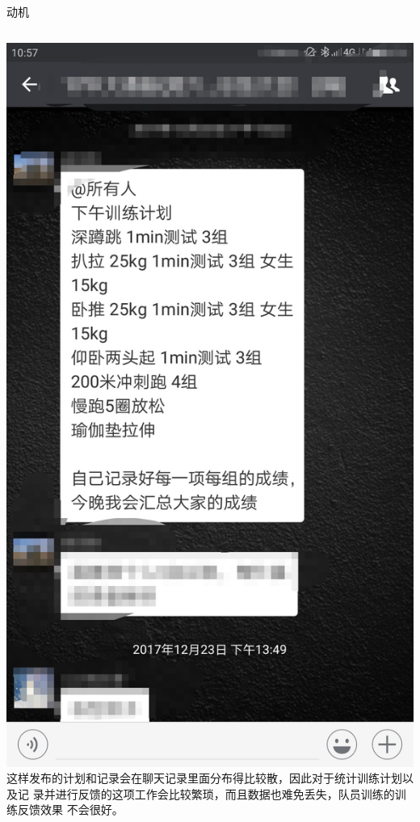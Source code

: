 \documentclass{beamer}
\begin{document}
\begin{frame}{动机}
{    \begin{columns}[onlytextwidth]
      \includegraphics[scale=0.1]{pic/wechat.png}
      这样发布的计划和记录会在聊天记录里面分布得比较散，因此对于统计训练计划以及记
      录并进行反馈的这项工作会比较繁琐，而且数据也难免丢失，队员训练的训练反馈效果
      不会很好。
    \end{columns}
    
  }


\end{frame}
\end{document}
